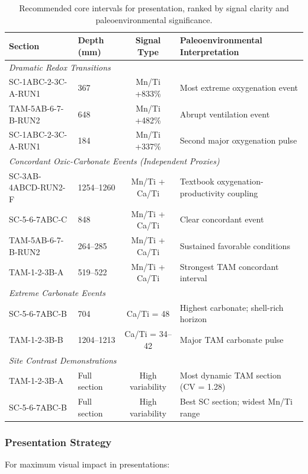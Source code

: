 \begin{table}[htbp]
\centering
\caption{Recommended core intervals for presentation, ranked by signal clarity and paleoenvironmental significance.}
\label{tab:presentation_intervals}
\small
\begin{tabular}{llcp{5.5cm}}
\toprule
Section & Depth (mm) & Signal Type & Paleoenvironmental Interpretation \\
\midrule
\multicolumn{4}{l}{\textit{Dramatic Redox Transitions}} \\
SC-1ABC-2-3C-A-RUN1 & 367 & Mn/Ti +833\% & Most extreme oxygenation event \\
TAM-5AB-6-7-B-RUN2 & 648 & Mn/Ti +482\% & Abrupt ventilation event \\
SC-1ABC-2-3C-A-RUN1 & 184 & Mn/Ti +337\% & Second major oxygenation pulse \\
\midrule
\multicolumn{4}{l}{\textit{Concordant Oxic-Carbonate Events (Independent Proxies)}} \\
SC-3AB-4ABCD-RUN2-F & 1254--1260 & Mn/Ti + Ca/Ti & Textbook oxygenation-productivity coupling \\
SC-5-6-7ABC-C & 848 & Mn/Ti + Ca/Ti & Clear concordant event \\
TAM-5AB-6-7-B-RUN2 & 264--285 & Mn/Ti + Ca/Ti & Sustained favorable conditions \\
TAM-1-2-3B-A & 519--522 & Mn/Ti + Ca/Ti & Strongest TAM concordant interval \\
\midrule
\multicolumn{4}{l}{\textit{Extreme Carbonate Events}} \\
SC-5-6-7ABC-B & 704 & Ca/Ti = 48 & Highest carbonate; shell-rich horizon \\
TAM-1-2-3B-B & 1204--1213 & Ca/Ti = 34--42 & Major TAM carbonate pulse \\
\midrule
\multicolumn{4}{l}{\textit{Site Contrast Demonstrations}} \\
TAM-1-2-3B-A & Full section & High variability & Most dynamic TAM section (CV = 1.28) \\
SC-5-6-7ABC-B & Full section & High variability & Best SC section; widest Mn/Ti range \\
\bottomrule
\end{tabular}
\end{table}

\subsubsection{Presentation Strategy}

For maximum visual impact in presentations:

